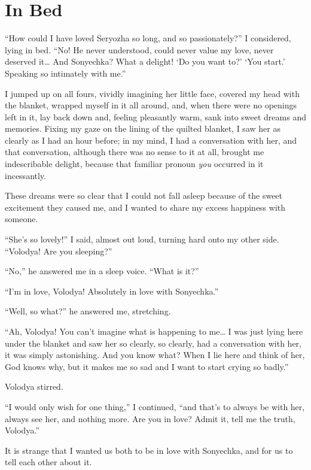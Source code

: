 \chapter{In Bed} %

``How could I have loved Seryozha so long, and so passionately?'' I considered, lying in bed. ``No! He never understood, could never value my love, never deserved it\ldots{} And Sonyechka? What a delight! `Do you want to?' `You start.' Speaking so intimately with me.'' %

I jumped up on all fours, vividly imagining her little face, covered my head with the blanket, wrapped myself in it all around, and, when there were no openings left in it, lay back down and, feeling pleasantly warm, sank into sweet dreams and memories. Fixing my gaze on the lining of the quilted blanket, I saw her as clearly as I had an hour before; in my mind, I had a conversation with her, and that conversation, although there was no sense to it at all, brought me indescribable delight, because that familiar pronoun \textit{you} occurred in it incessantly.

These dreams were so clear that I could not fall asleep because of the sweet excitement they caused me, and I wanted to share my excess happiness with someone. 

``She's so lovely!'' I said, almost out loud, turning hard onto my other side. ``Volodya! Are you sleeping?'' %

``No,'' he answered me in a sleep voice. ``What is it?'' %

``I'm in love, Volodya! Absolutely in love with Sonyechka.'' %

``Well, so what?'' he answered me, stretching.

``Ah, Volodya! You can't imagine what is happening to me\ldots{} I was just lying here under the blanket and saw her so clearly, so clearly, had a conversation with her, it was simply astonishing. And you know what? When I lie here and think of her, God knows why, but it makes me so sad and I want to start crying so badly.'' %

Volodya stirred.

``I would only wish for one thing,'' I continued, ``and that's to always be with her, always see her, and nothing more. Are you in love? Admit it, tell me the truth, Volodya.'' %

It is strange that I wanted us both to be in love with Sonyechka, and for us to tell each other about it.

